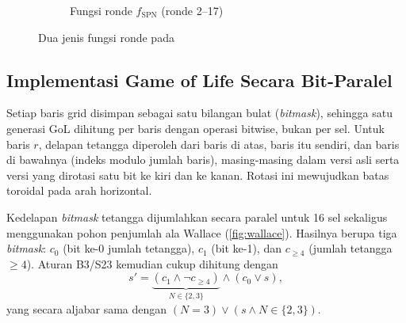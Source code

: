 \begin{figure}[H]
\begin{subfigure}[t]{0.47\textwidth}
        \caption{Fungsi ronde $f_{\text{SPN}}$ (ronde 2--17)}
        \label{fig:fspn}
    \end{subfigure}
    \caption{Dua jenis fungsi ronde pada \algname}
    \label{fig:fungsi-ronde}
\end{figure}

\subsection{Implementasi Game of Life Secara Bit-Paralel}
Setiap baris grid disimpan sebagai satu bilangan bulat (\textit{bitmask}), sehingga satu generasi GoL dihitung per baris dengan operasi bitwise, bukan per sel. Untuk baris $r$, delapan tetangga diperoleh dari baris di atas, baris itu sendiri, dan baris di bawahnya (indeks modulo jumlah baris), masing-masing dalam versi asli serta versi yang dirotasi satu bit ke kiri dan ke kanan. Rotasi ini mewujudkan batas toroidal pada arah horizontal.

Kedelapan \textit{bitmask} tetangga dijumlahkan secara paralel untuk 16 sel sekaligus menggunakan pohon penjumlah ala Wallace \cite{wallace1964} (\cref{fig:wallace}). Hasilnya berupa tiga \textit{bitmask}: $c_0$ (bit ke-0 jumlah tetangga), $c_1$ (bit ke-1), dan $c_{\ge4}$ (jumlah tetangga $\geq 4$). Aturan B3/S23 kemudian cukup dihitung dengan
\begin{equation}
    s' = \underbrace{(c_1 \wedge \lnot c_{\ge 4})}_{N \in \{2,3\}} \wedge (c_0 \vee s),
\end{equation}
yang secara aljabar sama dengan $(N = 3) \vee (s \wedge N \in \{2,3\})$.

